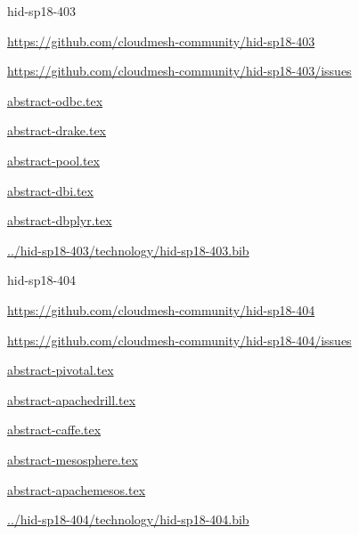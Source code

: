 \begin{IU}

hid-sp18-403

\url{https://github.com/cloudmesh-community/hid-sp18-403}

\url{https://github.com/cloudmesh-community/hid-sp18-403/issues}

\href{https://github.com/cloudmesh-community/hid-sp18-403/blob/master//technology/abstract-odbc.tex}{abstract-odbc.tex}

\href{https://github.com/cloudmesh-community/hid-sp18-403/blob/master//technology/abstract-drake.tex}{abstract-drake.tex}

\href{https://github.com/cloudmesh-community/hid-sp18-403/blob/master//technology/abstract-pool.tex}{abstract-pool.tex}

\href{https://github.com/cloudmesh-community/hid-sp18-403/blob/master//technology/abstract-dbi.tex}{abstract-dbi.tex}

\href{https://github.com/cloudmesh-community/hid-sp18-403/blob/master//technology/abstract-dbplyr.tex}{abstract-dbplyr.tex}

\href{https://github.com/cloudmesh-community/hid-sp18-403/blob/master//technology/hid-sp18-403.bib}{../hid-sp18-403/technology/hid-sp18-403.bib}

\end{IU}


\begin{IU}

hid-sp18-404

\url{https://github.com/cloudmesh-community/hid-sp18-404}

\url{https://github.com/cloudmesh-community/hid-sp18-404/issues}

\href{https://github.com/cloudmesh-community/hid-sp18-404/blob/master//technology/abstract-pivotal.tex}{abstract-pivotal.tex}

\href{https://github.com/cloudmesh-community/hid-sp18-404/blob/master//technology/abstract-apachedrill.tex}{abstract-apachedrill.tex}

\href{https://github.com/cloudmesh-community/hid-sp18-404/blob/master//technology/abstract-caffe.tex}{abstract-caffe.tex}

\href{https://github.com/cloudmesh-community/hid-sp18-404/blob/master//technology/abstract-mesosphere.tex}{abstract-mesosphere.tex}

\href{https://github.com/cloudmesh-community/hid-sp18-404/blob/master//technology/abstract-apachemesos.tex}{abstract-apachemesos.tex}

\href{https://github.com/cloudmesh-community/hid-sp18-404/blob/master//technology/hid-sp18-404.bib}{../hid-sp18-404/technology/hid-sp18-404.bib}

\end{IU}


